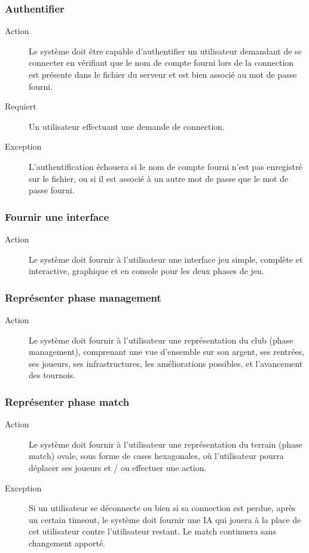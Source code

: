 \documentclass[a4paper]{article}
\begin{document}
\subsubsection{Authentifier}
\begin{description}
\item[Action] Le système doit être capable d'authentifier un \gls{utilisateur} demandant de se connecter en vérifiant que le nom de compte fourni lors de la connection est présente dans le fichier du \gls{serveur} et est bien associé au mot de passe fourni.
\item[Requiert] Un \gls{utilisateur} effectuant une demande de connection.
\item[Exception] L'authentification échouera si le nom de compte fourni n'est pas enregistré sur le fichier, ou si il est associé à un autre mot de passe que le mot de passe fourni.
\end{description}

\subsubsection{Fournir une interface}
\begin{description}
\item[Action] Le système doit fournir à l'\gls{utilisateur} une interface jeu simple, complète et interactive, graphique et en console pour les deux phases de jeu.
\end{description}

\subsubsection{Représenter phase management}
\begin{description}
\item[Action] Le système doit fournir à l'\gls{utilisateur} une représentation du \gls{club} (phase management), comprenant une vue d'ensemble sur son argent, ses rentrées, ses \glspl{joueur}, ses infrastructures, les améliorations possibles, et l'avancement des tournois.
\end{description}

\subsubsection{Représenter phase match}
\begin{description}
\item[Action] Le système doit fournir à l'\gls{utilisateur} une représentation du terrain (phase match) ovale, sous forme de cases hexagonales, où l'\gls{utilisateur} pourra déplacer ses \glspl{joueur} et / ou effectuer une action.
\item[Exception] Si un \gls{utilisateur} se déconnecte ou bien si sa connection est perdue, après un certain timeout, le système doit fournir une IA qui jouera à la place de cet \gls{utilisateur} contre l'\gls{utilisateur} restant. Le match continuera sans changement apporté.
\end{description}
\end{document}
